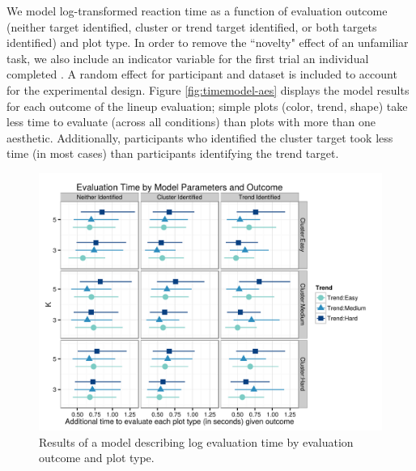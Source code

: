 \documentclass[11pt]{isuthesis}\usepackage[]{graphicx}\usepackage[]{color}
\newenvironment{knitrout}{}{} %
\begin{document}
We model log-transformed reaction time as a function of evaluation outcome (neither target identified, cluster or trend target identified, or both targets identified) and plot type. In order to remove the ``novelty" effect of an unfamiliar task, we also include an indicator variable for the first trial an individual completed \citep{Majumder:2014up}. A random effect for participant and dataset is included to account for the experimental design. Figure \ref{fig:timemodel-aes} displays the model results for each outcome of the lineup evaluation; simple plots (color, trend, shape) take less time to evaluate (across all conditions) than plots with more than one aesthetic. Additionally, participants who identified the cluster target took less time (in most cases) than participants identifying the trend target.  

\begin{figure}[ht]\centering
\begin{knitrout}
\color{fgcolor}

{\centering \includegraphics[width=.8\linewidth]{Figure/FeatureHierarchy/fig-timemodel-pars-1} 

}



\end{knitrout}
\caption[Log evaluation time by outcome and plot parameters]{\label{fig:timemodel-pars} Results of a model describing log evaluation time by evaluation outcome and plot type.}
\end{figure}

\end{document}
